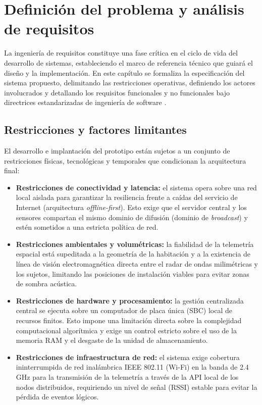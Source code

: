 \newpage
\section{Definición del problema y análisis de requisitos}
\label{cap:analisis_requisitos}

La ingeniería de requisitos constituye una fase crítica en el ciclo de vida del desarrollo de sistemas, estableciendo el marco de referencia técnico que guiará el diseño y la implementación. En este capítulo se formaliza la especificación del sistema propuesto, delimitando las restricciones operativas, definiendo los actores involucrados y detallando los requisitos funcionales y no funcionales bajo directrices estandarizadas de ingeniería de software \cite{iso29148}.

\subsection{Restricciones y factores limitantes}
El desarrollo e implantación del prototipo están sujetos a un conjunto de restricciones físicas, tecnológicas y temporales que condicionan la arquitectura final:
\begin{itemize}
    \item \textbf{Restricciones de conectividad y latencia:} el sistema opera sobre una red local aislada para garantizar la resiliencia frente a caídas del servicio de Internet (arquitectura \textit{offline-first}). Esto exige que el servidor central y los sensores compartan el mismo dominio de difusión (dominio de \textit{broadcast}) y estén sometidos a una estricta política de red.
    \item \textbf{Restricciones ambientales y volumétricas:} la fiabilidad de la telemetría espacial está supeditada a la geometría de la habitación y a la existencia de línea de visión electromagnética directa entre el radar de ondas milimétricas y los sujetos, limitando las posiciones de instalación viables para evitar zonas de sombra acústica.

    \item \textbf{Restricciones de hardware y procesamiento:} la gestión centralizada central se ejecuta sobre un computador de placa única (SBC) local de recursos finitos. Esto impone una limitación directa sobre la complejidad computacional algorítmica y exige un control estricto sobre el uso de la memoria RAM y el desgaste de la unidad de almacenamiento.
    \item \textbf{Restricciones de infraestructura de red:} el sistema exige cobertura ininterrumpida de red inalámbrica IEEE 802.11 (Wi-Fi) en la banda de 2.4 GHz para la transmisión de la telemetría a través de la API local de los nodos distribuidos, requiriendo un nivel de señal (RSSI) estable para evitar la pérdida de eventos lógicos.
\end{itemize}

